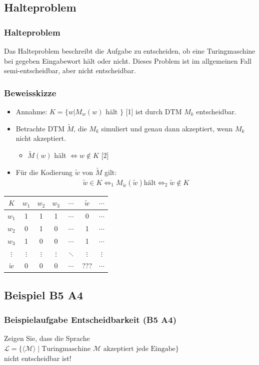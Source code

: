 \subsection{Halteproblem}
\begin{frame}
	\frametitle{Halteproblem}
	Das Halteproblem beschreibt die Aufgabe zu entscheiden, ob eine Turingmaschine bei gegeben Eingabewort hält oder nicht. Dieses Problem ist im allgemeinen Fall semi-entscheidbar, aber nicht entscheidbar.
\end{frame}
\begin{frame}
	\frametitle{Beweisskizze}
	\begin{itemize}
		\item Annahme: $K = \{ w \vert M_w(w)$ hält $\}$ [1] ist durch DTM $M_k$ entscheidbar.
		\item Betrachte DTM $\tilde M$, die $M_k$ simuliert und genau dann akzeptiert, wenn $M_k$ nicht akzeptiert.
		\begin{itemize}
			\item $\tilde M(w)$ hält $\Leftrightarrow w \not \in K$ [2]
		\end{itemize}
		\item Für die Kodierung $\tilde w$ von $\tilde M$ gilt:
		\begin{align*}
			\tilde w \in K \Leftrightarrow_1 M_{\tilde w}(\tilde w) \text{hält} \Leftrightarrow_2 \tilde w \not \in K
		\end{align*}
	\end{itemize}
	\begin{tabular}{|c|c|c|c|c|c|c|}
	\hline
	$K$ & $w_1$ & $w_2$ & $w_3$ & $\cdots$ & $\tilde w$ & $\cdots$\\
	\hline
	$w_1$ & \color{red} 1 & 1 & 1 & $\cdots$ & 0 & $\cdots$\\
	\hline
	$w_2$ & 0 & \color{red} 1 & 0 & $\cdots$ & 1 & $\cdots$\\
	\hline
	$w_3$ & 1 & 0 & \color{red} 0 & $\cdots$ & 1 & $\cdots$\\
	\hline
	$\vdots$ & $\vdots$ & $\vdots$ & $\vdots$ & \color{red} $\ddots$ & $\vdots$ & $\vdots$\\
	\hline
	$\tilde w$ & 0 & 0 & 0 & $\cdots$ & \color{red} ??? & $\cdots$\\
	\hline
	\end{tabular}
\end{frame}
\subsection{Beispiel B5 A4}
\begin{frame}
	\frametitle{Beispielaufgabe Entscheidbarkeit (B5 A4)}
	Zeigen Sie, dass die Sprache \\ $\mathcal{L} = \{ \langle \mathcal{M} \rangle \; | \; \mbox{Turingmaschine $\mathcal{M}$ akzeptiert jede Eingabe} \}$ \\ nicht entscheidbar ist!
\end{frame}
